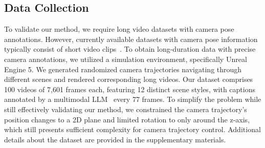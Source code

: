 

\subsection{Data Collection}
\label{subsec:data}
To validate our method, we require long video datasets with camera pose annotations. However, currently available datasets with camera pose information typically consist of short video clips~\cite{realestate, recammaster}. To obtain long-duration data with precise camera annotations, we utilized a simulation environment, specifically Unreal Engine 5. We generated randomized camera trajectories navigating through different scenes and rendered corresponding long videos. Our dataset comprises 100 videos of 7,601 frames each, featuring 12 distinct scene styles, with captions annotated by a multimodal LLM~\cite{minicpm} every 77 frames. To simplify the problem while still effectively validating our method, we constrained the camera trajectory's position changes to a 2D plane and limited rotation to only around the z-axis, which still presents sufficient complexity for camera trajectory control.
Additional details about the dataset are provided in the supplementary materials.
